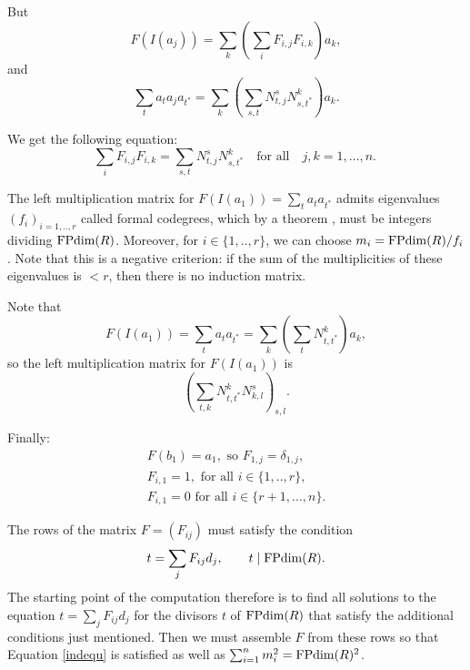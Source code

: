 But
\[ F(I(a_j)) = \sum_k \left( \sum_i F_{i,j} F_{i,k} \right) a_k, \]
and
\[ \sum_t a_t a_j a_{t^*} = \sum_k \left( \sum_{s,t} N_{t,j}^s N_{s,t^*}^k \right) a_k. \]

We get the following equation:
\begin{equation}
\sum_i F_{i,j} F_{i,k} = \sum_{s,t} N_{t,j}^s N_{s,t^*}^k\quad\text{for all}\quad j,k = 1,\dots,n. \ \label{indequ}
\end{equation}


The left multiplication matrix for $F(I(a_1)) = \sum_t a_t a_{t^*}$ admits eigenvalues $(f_i)_{i=1,..,r}$ called formal codegrees, which by a theorem \cite[Cor. 2.14]{Ost}, must be integers dividing $\operatorname{FPdim}(R)$. Moreover, for $i \in \{1,..,r\}$, we can choose $m_i = \operatorname{FPdim}(R)/f_i$. Note that this is a negative criterion: if the sum of the multiplicities of these eigenvalues is $< r$, then there is no induction matrix.

Note that
\[ F(I(a_1)) = \sum_t a_t a_{t^*} = \sum_k \left( \sum_t N_{t,t^*}^k \right) a_k, \]
so the left multiplication matrix for $F(I(a_1))$ is
\[ \left( \sum_{t,k} N_{t,t^*}^k N_{k,l}^s \right) _{s,l}. \]

Finally:
\begin{gather*}
 F(b_1) = a_1, \text{ so } F_{1,j} = \delta_{1,j}, \\
 F_{i,1} = 1, \text{ for all } i \in \{1,..,r\}, \\
 F_{i,1} = 0 \text{ for all } i \in \{r+1,\ldots,n\}.
\end{gather*} 

The rows of the matrix $F = (F_{ij})$ must satisfy the condition
$$
t = \sum_{j} F_{ij} d_j, \qquad t\mid \operatorname{FPdim}(R).
$$
The starting point of the computation therefore is to find all solutions to the equation $t = \sum_{j} F_{ij} d_j$ for the divisors $t$ of $\operatorname{FPdim}(R)$ that satisfy the additional conditions just mentioned. Then we must assemble $F$ from these rows so that Equation \eqref{indequ} is satisfied as well as $\sum_{i=1}^n m_i^2 = \operatorname{FPdim}(R)^2$. 

